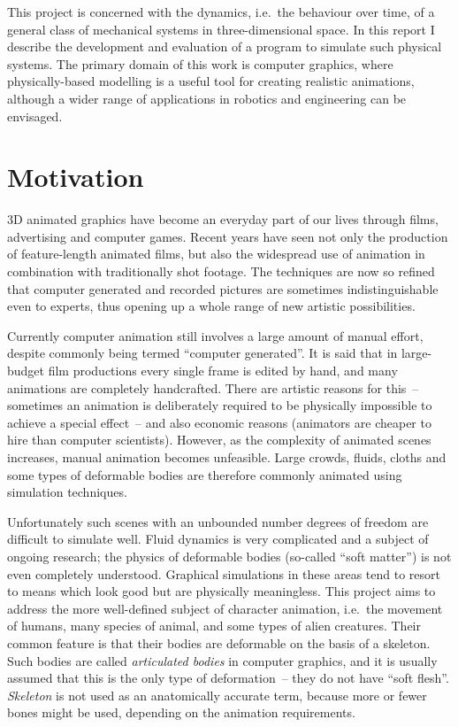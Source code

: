 This project is concerned with the dynamics, i.e.\ the behaviour over time, of a general class
of mechanical systems in three-dimensional space. In this report I describe the development and
evaluation of a program to simulate such physical systems. The primary domain of this work is
computer graphics, where physically-based modelling is a useful tool for creating realistic
animations, although a wider range of applications in robotics and engineering can be envisaged.

\section{Motivation}

3D animated graphics have become an everyday part of our lives through films, advertising and
computer games. Recent years have seen not only the production of feature-length animated films,
but also the widespread use of animation in combination with traditionally shot footage. The
techniques are now so refined that computer generated and recorded pictures are sometimes
indistinguishable even to experts, thus opening up a whole range of new artistic possibilities.

Currently computer animation still involves a large amount of manual effort, despite commonly
being termed ``computer generated''. It is said that in large-budget film productions every single
frame is edited by hand, and many animations are completely handcrafted. There are artistic
reasons for this~-- sometimes an animation is deliberately required to be physically impossible
to achieve a special effect~-- and also economic reasons (animators are cheaper to hire than
computer scientists). However, as the complexity of animated scenes increases, manual animation
becomes unfeasible. Large crowds, fluids, cloths and some types of deformable bodies are therefore
commonly animated using simulation techniques.

Unfortunately such scenes with an unbounded number degrees of freedom are difficult to simulate
well. Fluid dynamics is very complicated and a subject of ongoing research; the physics of
deformable bodies (so-called ``soft matter'') is not even completely understood. Graphical
simulations in these areas tend to resort to means which look good but are physically meaningless.
This project aims to address the more well-defined subject of character animation, i.e.\ the
movement of humans, many species of animal, and some types of alien creatures. Their common
feature is that their bodies are deformable on the basis of a skeleton. Such bodies are called
\emph{articulated bodies} in computer graphics, and it is usually assumed that this is the only
type of deformation~-- they do not have ``soft flesh''. \textsl{Skeleton} is not used as an
anatomically accurate term, because more or fewer bones might be used, depending on the animation
requirements.

